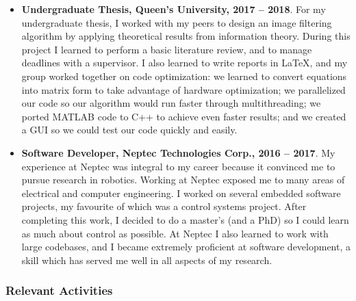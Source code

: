 \documentclass[a4paper,12pt]{article}
\begin{document}
\begin{itemize}
    \item \textbf{Undergraduate Thesis, Queen's University, 2017 -- 2018}.
        For my undergraduate thesis, I worked with my peers to design an image
        filtering algorithm by applying theoretical results from information theory.
        During this project I learned to perform a basic literature review,
        and to manage deadlines with a supervisor.
        I also learned to write reports in LaTeX,
        and my group worked together on code optimization: we learned to
        convert equations into matrix form to take advantage of hardware
        optimization; we parallelized our code so our algorithm would run faster
        through multithreading; we ported MATLAB code to C++ to achieve even
        faster results; and we created a GUI so we could test our code quickly
        and easily.

    \item \textbf{Software Developer, Neptec Technologies Corp., 2016 -- 2017}.
        My experience at Neptec was integral to my career because it convinced
        me to pursue research in robotics.
        Working at Neptec exposed me to many areas of electrical and computer
        engineering.
        I worked on several embedded software projects, my favourite of which
        was a control systems project.
        After completing this work, I decided to do a master's (and a PhD) so I
        could learn as much about control as possible.
        At Neptec I also learned to work with large codebases,
        and I became extremely proficient at software development, a skill which
        has served me well in all aspects of my research.
        
\end{itemize}

\subsubsection*{Relevant Activities}
\end{document}
